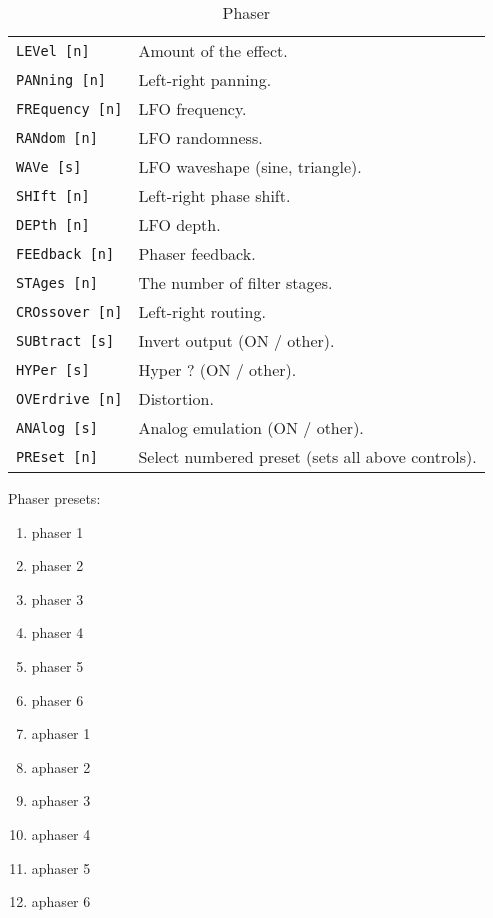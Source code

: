    \begin{table}[H]
      \centering
      \caption{Phaser}
      \begin{tabular}{l l}
\texttt{LEVel [n]} &
   Amount of the effect. \\
\texttt{PANning [n]} &
   Left-right panning. \\
\texttt{FREquency [n]} &
   LFO frequency. \\
\texttt{RANdom [n]} &
   LFO randomness. \\
\texttt{WAVe [s]} &
   LFO waveshape (sine, triangle). \\
\texttt{SHIft [n]} &
   Left-right phase shift. \\
\texttt{DEPth [n]} &
   LFO depth. \\
\texttt{FEEdback [n]} &
   Phaser feedback. \\
\texttt{STAges [n]} &
   The number of filter stages. \\
\texttt{CROssover [n]} &
   Left-right routing. \\
\texttt{SUBtract [s]} &
   Invert output (ON / other). \\
\texttt{HYPer [s]} &
   Hyper ?   (ON / other). \\
\texttt{OVErdrive [n]} &
   Distortion. \\
\texttt{ANAlog [s]} &
   Analog emulation  (ON / other). \\
\texttt{PREset [n]} &
   Select numbered preset (sets all above controls). \\
      \end{tabular}
   \end{table}
Phaser presets:
   \begin{enumerate}
   \item phaser 1
   \item phaser 2
   \item phaser 3
   \item phaser 4
   \item phaser 5
   \item phaser 6
   \item aphaser 1
   \item aphaser 2
   \item aphaser 3
   \item aphaser 4
   \item aphaser 5
   \item aphaser 6
   \end{enumerate}

